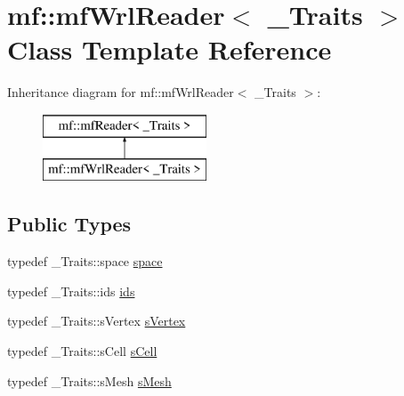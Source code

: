 \hypertarget{classmf_1_1mfWrlReader}{
\section{mf::mfWrlReader$<$ \_\-Traits $>$ Class Template Reference}
\label{classmf_1_1mfWrlReader}
}
Inheritance diagram for mf::mfWrlReader$<$ \_\-Traits $>$:\begin{figure}[H]
\begin{center}
\leavevmode
\includegraphics[height=2.000000cm]{classmf_1_1mfWrlReader}
\end{center}
\end{figure}
\subsection*{Public Types}
\begin{DoxyCompactItemize}
\item 
typedef \_\-Traits::space \hyperlink{classmf_1_1mfWrlReader_a1444633a52ae33327e44cab3b29a2547}{space}
\item 
typedef \_\-Traits::ids \hyperlink{classmf_1_1mfWrlReader_a218ccc566be4401a60f0b321effaae8c}{ids}
\item 
typedef \_\-Traits::sVertex \hyperlink{classmf_1_1mfWrlReader_a07a838e7ca326205d3f103aadcfc47a0}{sVertex}
\item 
typedef \_\-Traits::sCell \hyperlink{classmf_1_1mfWrlReader_a166fbf92ac3c8aad7eb1d8acf7f7541c}{sCell}
\item 
typedef \_\-Traits::sMesh \hyperlink{classmf_1_1mfWrlReader_a00a23984c72a850fbc105870596d6d78}{sMesh}
\end{DoxyCompactItemize}
